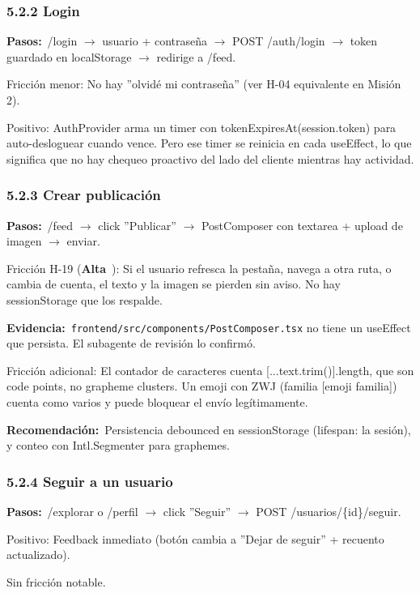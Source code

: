 \documentclass[10pt,a4paper]{article}
\newcommand{\code}[1]{\nolinkurl{#1}}
\newcommand{\badgeAlta}{\colorbox{orange!20}{\textcolor{orange!90!black}{\textbf{\footnotesize Alta}}}}
\begin{document}
\subsubsection{5.2.2 Login}
\noindent\textbf{Pasos:}\ /login $\rightarrow$ usuario + contraseña $\rightarrow$ POST /auth/login $\rightarrow$ token guardado en localStorage $\rightarrow$ redirige a /feed.\par\vspace{0.4em}
Fricción menor: No hay ''olvidé mi contraseña'' (ver H-04 equivalente en Misión 2).\par\vspace{0.4em}
Positivo: AuthProvider arma un timer con tokenExpiresAt(session.token) para auto-desloguear cuando vence. Pero ese timer se reinicia en cada useEffect, lo que significa que no hay chequeo proactivo del lado del cliente mientras hay actividad.\par\vspace{0.4em}
\subsubsection{5.2.3 Crear publicación}
\noindent\textbf{Pasos:}\ /feed $\rightarrow$ click ''Publicar'' $\rightarrow$ PostComposer con textarea + upload de imagen $\rightarrow$ enviar.\par\vspace{0.4em}
Fricción H-19 (\badgeAlta\ ): Si el usuario refresca la pestaña, navega a otra ruta, o cambia de cuenta, el texto y la imagen se pierden sin aviso. No hay sessionStorage que los respalde.\par\vspace{0.4em}
\noindent\textbf{Evidencia:}\ \code{frontend/src/components/PostComposer.tsx} no tiene un useEffect que persista. El subagente de revisión lo confirmó.\par\vspace{0.4em}
Fricción adicional: El contador de caracteres cuenta [...text.trim()].length, que son code points, no grapheme clusters. Un emoji con ZWJ (familia [emoji familia]) cuenta como varios y puede bloquear el envío legítimamente.\par\vspace{0.4em}
\noindent\textbf{Recomendación:}\ Persistencia debounced en sessionStorage (lifespan: la sesión), y conteo con Intl.Segmenter para graphemes.\par\vspace{0.4em}
\subsubsection{5.2.4 Seguir a un usuario}
\noindent\textbf{Pasos:}\ /explorar o /perfil $\rightarrow$ click ''Seguir'' $\rightarrow$ POST /usuarios/\{id\}/seguir.\par\vspace{0.4em}
Positivo: Feedback inmediato (botón cambia a ''Dejar de seguir'' + recuento actualizado).\par\vspace{0.4em}
Sin fricción notable.\par\vspace{0.4em}
\end{document}
